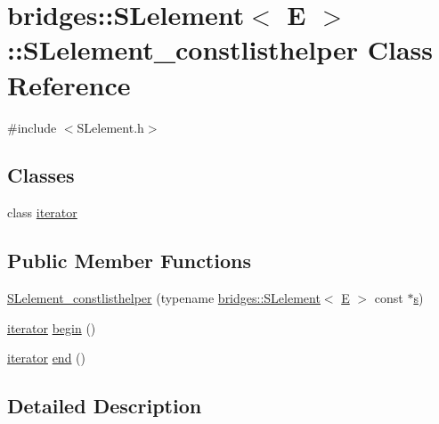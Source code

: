 \hypertarget{classbridges_1_1_s_lelement_1_1_s_lelement__constlisthelper}{}\section{bridges\+::S\+Lelement$<$ E $>$\+::S\+Lelement\+\_\+constlisthelper Class Reference}
\label{classbridges_1_1_s_lelement_1_1_s_lelement__constlisthelper}


{\ttfamily \#include $<$S\+Lelement.\+h$>$}

\subsection*{Classes}
\begin{DoxyCompactItemize}
\item 
class \mbox{\hyperlink{classbridges_1_1_s_lelement_1_1_s_lelement__constlisthelper_1_1iterator}{iterator}}
\end{DoxyCompactItemize}
\subsection*{Public Member Functions}
\begin{DoxyCompactItemize}
\item 
\mbox{\hyperlink{classbridges_1_1_s_lelement_1_1_s_lelement__constlisthelper_ab5a8cde7ff6fa03210116f9e170b1dbf}{S\+Lelement\+\_\+constlisthelper}} (typename \mbox{\hyperlink{classbridges_1_1_s_lelement}{bridges\+::\+S\+Lelement}}$<$ \mbox{\hyperlink{namespacebridges_acfb0a4f7877d8f63de3e6862004c50eda3a3ea00cfc35332cedf6e5e9a32e94da}{E}} $>$ const $\ast$\mbox{\hyperlink{namespacebridges_acfb0a4f7877d8f63de3e6862004c50eda03c7c0ace395d80182db07ae2c30f034}{s}})
\item 
\mbox{\hyperlink{classbridges_1_1_s_lelement_1_1_s_lelement__constlisthelper_1_1iterator}{iterator}} \mbox{\hyperlink{classbridges_1_1_s_lelement_1_1_s_lelement__constlisthelper_a8e249ed544f62a325b0e5b047519b70e}{begin}} ()
\item 
\mbox{\hyperlink{classbridges_1_1_s_lelement_1_1_s_lelement__constlisthelper_1_1iterator}{iterator}} \mbox{\hyperlink{classbridges_1_1_s_lelement_1_1_s_lelement__constlisthelper_a55dafccf3d35b8746b2de761c2309cef}{end}} ()
\end{DoxyCompactItemize}


\subsection{Detailed Description}
